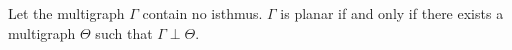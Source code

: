 Let the multigraph $\Gamma$ contain no isthmus. $\Gamma$ is planar if and only if there exists a multigraph $\Theta$ such that $\Gamma \perp \Theta$.
